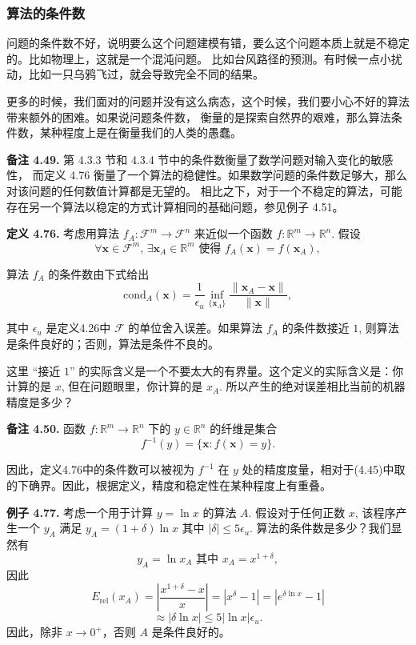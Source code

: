 \documentclass[a4paper]{ctexart}
\begin{document}
{%

\subsubsection{算法的条件数}

问题的条件数不好，说明要么这个问题建模有错，要么这个问题本质上就是不稳定的。比如物理上，这就是一个混沌问题。
比如台风路径的预测。有时候一点小扰动，比如一只乌鸦飞过，就会导致完全不同的结果。

更多的时候，我们面对的问题并没有这么病态，这个时候，我们要小心不好的算法带来额外的困难。如果说问题条件数，
衡量的是探索自然界的艰难，那么算法条件数，某种程度上是在衡量我们的人类的愚蠢。

\noindent \textbf{备注 4.49. } 第 4.3.3 节和 4.3.4 节中的条件数衡量了数学问题对输入变化的敏感性，
而定义 4.76 衡量了一个算法的稳健性。如果数学问题的条件数足够大，那么对该问题的任何数值计算都是无望的。
相比之下，对于一个不稳定的算法，可能存在另一个算法以稳定的方式计算相同的基础问题，参见例子 4.51。

\noindent \textbf{定义 4.76. } 考虑用算法 \( f_A : \mathcal{F}^m \rightarrow \mathcal{F}^n \) 来近似一个函数 \( f : \mathbb{R}^m \rightarrow \mathbb{R}^n \).
假设
\[
  \forall \mathbf{x} \in \mathcal{F}^m, \, \exists \mathbf{x}_A \in \mathbb{R}^m \text{ 使得 } f_A(\mathbf{x}) = f(\mathbf{x}_A),
\]

算法 \( f_A \) 的条件数由下式给出
\[
  \text{cond}_A(\mathbf{x}) = \frac{1}{\epsilon_u} \inf_{\{\mathbf{x}_A\}} \frac{\|\mathbf{x}_A - \mathbf{x}\|}{\|\mathbf{x}\|},
\]

其中 \( \epsilon_u \) 是定义4.26中 \( \mathcal{F} \) 的单位舍入误差。如果算法 \( f_A \) 的条件数接近 $1$, 则算法是条件良好的；否则，算法是条件不良的。

这里 ``接近 $1$'' 的实际含义是一个不要太大的有界量。这个定义的实际含义是：你计算的是 $x$, 但在问题眼里，你计算的是 $x_A$.
所以产生的绝对误差相比当前的机器精度是多少？

\noindent \textbf{备注 4.50.} 函数 \( f: \mathbb{R}^m \rightarrow \mathbb{R}^n \) 下的 \( y \in \mathbb{R}^n \) 的纤维是集合
\[
f^{-1}(y) = \{ \mathbf{x} : f(\mathbf{x}) = y \}.
\]

因此，定义4.76中的条件数可以被视为 \( f^{-1} \) 在 \( y \) 处的精度度量，相对于(4.45)中取的下确界。因此，根据定义，精度和稳定性在某种程度上有重叠。

\noindent \textbf{例子 4.77.} 考虑一个用于计算 \( y = \ln x \) 的算法 \( A \). 
假设对于任何正数 \( x \), 该程序产生一个 \( y_A \) 满足 \( y_A = (1 + \delta) \ln x \) 其中 \( |\delta| \leq 5 \epsilon_u \). 
算法的条件数是多少？我们显然有
\[
  y_A = \ln x_A \text{ 其中 } x_A = x^{1 + \delta},
\]
因此
\[
  E_{\text{rel}}(x_A) = \left| \frac{x^{1 + \delta} - x}{x} \right| = |x^\delta - 1| = |e^{\delta \ln x} - 1|
\]
\[
\approx |\delta \ln x| \leq 5 |\ln x| \epsilon_u.
\]
因此，除非 \( x \rightarrow 0^+ \)，否则 \( A \) 是条件良好的。


}
\end{document}
